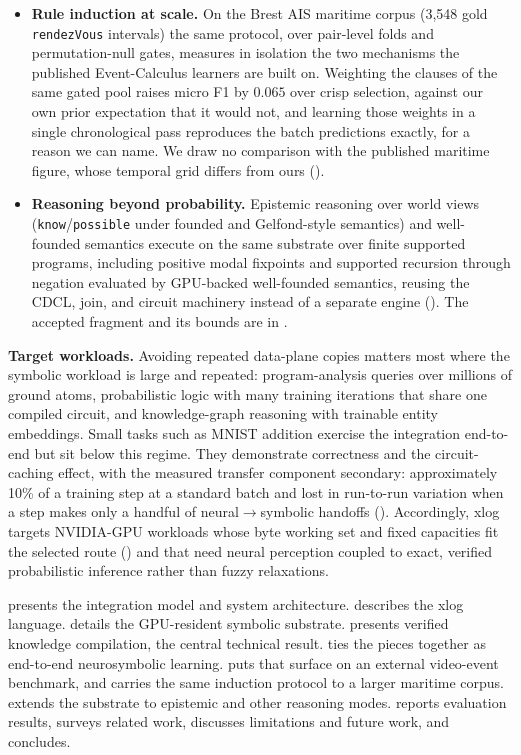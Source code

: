 \begin{itemize}
  \item \textbf{Rule induction at scale.} On the Brest AIS maritime corpus (3{,}548 gold \texttt{rendezVous} intervals) the same protocol, over pair-level folds and permutation-null gates, measures in isolation the two mechanisms the published Event-Calculus learners are built on. Weighting the clauses of the same gated pool raises micro F1 by $0.065$ over crisp selection, against our own prior expectation that it would not, and learning those weights in a single chronological pass reproduces the batch predictions exactly, for a reason we can name. We draw no comparison with the published maritime figure, whose temporal grid differs from ours ().
  \item \textbf{Reasoning beyond probability.} Epistemic reasoning over world views (\texttt{know}/\texttt{possible} under founded and Gelfond-style semantics) and well-founded semantics execute on the same substrate over finite supported programs, including positive modal fixpoints and supported recursion through negation evaluated by GPU-backed well-founded semantics, reusing the CDCL, join, and circuit machinery instead of a separate engine (). The accepted fragment and its bounds are in .
\end{itemize}

\textbf{Target workloads.} Avoiding repeated data-plane copies matters most where the symbolic workload is large and repeated: program-analysis queries over millions of ground atoms, probabilistic logic with many training iterations that share one compiled circuit, and knowledge-graph reasoning with trainable entity embeddings. Small tasks such as MNIST addition exercise the integration end-to-end but sit below this regime. They demonstrate correctness and the circuit-caching effect, with the measured transfer component secondary: approximately 10\% of a training step at a standard batch and lost in run-to-run variation when a step makes only a handful of neural$\to$symbolic handoffs (). Accordingly, xlog targets NVIDIA-GPU workloads whose byte working set and fixed capacities fit the selected route () and that need neural perception coupled to exact, verified probabilistic inference rather than fuzzy relaxations.

 presents the integration model and system architecture.  describes the xlog language.  details the GPU-resident symbolic substrate.  presents verified knowledge compilation, the central technical result.  ties the pieces together as end-to-end neurosymbolic learning.  puts that surface on an external video-event benchmark, and  carries the same induction protocol to a larger maritime corpus.  extends the substrate to epistemic and other reasoning modes.  reports evaluation results,  surveys related work,  discusses limitations and future work, and  concludes.
